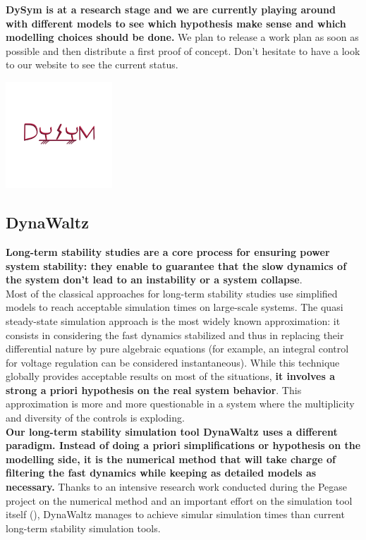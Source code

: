 \documentclass[a4paper, 12pt]{report}
\begin{document}
\textbf{DySym is at a research stage and we are currently playing around with different models to see which hypothesis make sense and which modelling choices should be done.} We plan to release a work plan as soon as possible and then distribute a first proof of concept. Don't hesitate to have a look to our website to see the current status.

\begin{center}
\includegraphics[width=0.3\textwidth]{../resources/DySym.png}
\end{center}

\newpage
\subsection{DynaWaltz}

\textbf{Long-term stability studies are a core process for ensuring power system stability: they enable to guarantee that the slow dynamics of the system don't lead to an instability or a system collapse}.\\

Most of the classical approaches for long-term stability studies use simplified models to reach acceptable simulation times on large-scale systems. The quasi steady-state simulation approach is the most widely known approximation: it consists in considering the fast dynamics stabilized and thus in replacing their differential nature by pure algebraic equations (for example, an integral control for voltage regulation can be considered instantaneous). While this technique globally provides acceptable results on most of the situations, \textbf{it involves a strong a priori hypothesis on the real system behavior}. This approximation is more and more questionable in a system where the multiplicity and diversity of the controls is exploding. \\

\textbf{Our long-term stability simulation tool DynaWaltz uses a different paradigm. Instead of doing a priori simplifications or hypothesis on the modelling side, it is the numerical method that will take charge of filtering the fast dynamics while keeping as detailed models as necessary.} Thanks to an intensive research work conducted during the Pegase project on the numerical method and an important effort on the simulation tool itself (\cite{SpeedUpDynaWaltz}), DynaWaltz manages to achieve simular simulation times than current long-term stability simulation tools.\\
\end{document}
